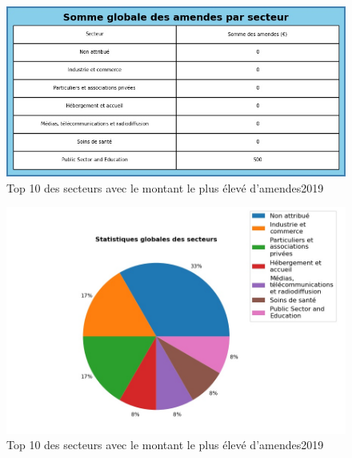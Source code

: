 \documentclass[french]{article}
\begin{document}
		
	\begin{multicols}{2}
	\begin{figure}
		[H]\centering\includegraphics[width=1.0\linewidth]{graphs/sector_data_year_fines}
		\caption{Top 10 des secteurs avec le montant le plus élevé d'amendes2019}
	\end{figure}
	\begin{figure}
		[H]\centering\includegraphics[width=1\linewidth]{graphs/sector_data_year}
		\caption{Top 10 des secteurs avec le montant le plus élevé d'amendes2019}
	 \end{figure}
	
	\end{multicols}
\end{document}

